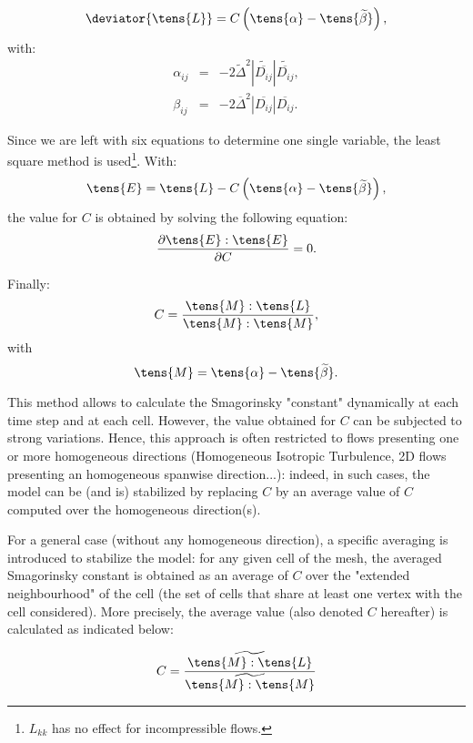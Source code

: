 \begin{description}
\begin{equation}
\deviator{\tens{L}} =  C \left(
\tens{ \alpha}- \tens{\widetilde{\beta}} \right),
\end{equation}
with:
\begin{equation}
\begin{array}{rcl}
\alpha_{ij} &=& -2 \widetilde{\Delta}^2 |\widetilde{\overline{D_{ij}}}|
\widetilde{\overline{D_{ij}}} , \\
\beta_{ij} &=& -2 \overline{\Delta}^2 |\overline{D_{ij}}| \overline{D_{ij}}.
\end{array}
\end{equation}

Since we are left with six equations to determine one single variable, the
least square method is used\footnote{$L_{kk}$ has no effect for
incompressible flows.}. With:
\begin{equation}
\tens{E} = \tens{L}-C \left( \tens{\alpha} - \tens{\widetilde{\beta}} \right),
\end{equation}
the value for $C$ is obtained by solving the following equation:
\begin{equation}
\frac{\partial \tens{E} : \tens{E}}{\partial C} = 0.
\end{equation}

Finally:
\begin{equation}
C = \frac{ \tens{M} : \tens{L} }{ \tens{M} : \tens{M}},
\end{equation}
with
\begin{equation}
\tens{M} = \tens{\alpha} - \tens{\widetilde{\beta}}.
\end{equation}

This method allows to calculate the Smagorinsky "constant" dynamically at
each time step and at each cell. However, the value obtained for $C$ can be
subjected to strong variations. Hence, this approach is often restricted to
flows presenting one or more homogeneous directions (Homogeneous Isotropic
Turbulence, 2D flows presenting an homogeneous spanwise direction...):
indeed, in such cases, the model can be (and is) stabilized by replacing $C$
by an average value of $C$ computed over the homogeneous direction(s).

For a general case (without any homogeneous direction), a specific averaging
is introduced to stabilize the model: for any given cell of the mesh, the
averaged Smagorinsky constant is obtained as an average of $C$ over the
"extended neighbourhood" of the cell (the set of cells that share at least
one vertex with the cell considered). More precisely, the average value
(also denoted $C$ hereafter) is calculated as indicated below:

\begin{equation}
C = \frac{\widetilde{ \tens{M} : \tens{L}}} {\widetilde{ \tens{M} : \tens{M}}}
\end{equation}

\end{description}

